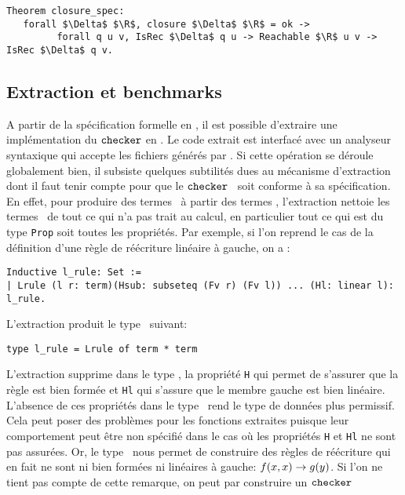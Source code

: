 \begin{lstlisting}
Theorem closure_spec:
   forall $\Delta$ $\R$, closure $\Delta$ $\R$ = ok ->
         forall q u v, IsRec $\Delta$ q u -> Reachable $\R$ u v -> IsRec $\Delta$ q v.
\end{lstlisting}

\subsection{Extraction et benchmarks}
\label{sec:benchmarks}

A partir de la spécification formelle en \coq, il est possible d'extraire une implémentation
du $\mathtt{checker}$ en \ocaml. 
Le code extrait est interfacé avec un analyseur syntaxique qui accepte les fichiers générés
par \timbuk. Si cette opération se déroule globalement bien, il subsiste quelques subtilités
dues au mécanisme d'extraction dont il faut tenir compte pour que le $\mathtt{checker}$ \ocaml\ soit conforme 
à sa spécification. En effet, pour produire des termes \ocaml\ à partir des termes \coq, l'extraction
nettoie les termes \coq\ de tout ce qui n'a pas trait au calcul, en particulier tout ce qui est du type
\lstinline!Prop! soit toutes les propriétés. Par exemple, si l'on reprend le cas de la définition 
d'une règle de réécriture linéaire à gauche, on a :
\begin{lstlisting}
Inductive l_rule: Set :=
| Lrule (l r: term)(Hsub: subseteq (Fv r) (Fv l)) ... (Hl: linear l): l_rule.
\end{lstlisting}
L'extraction produit le type \ocaml\ suivant:
\switchlstcaml
\begin{lstlisting}
type l_rule = Lrule of term * term
\end{lstlisting}
L'extraction supprime dans le type \ocaml, la propriété \lstinline!H! qui permet de s'assurer que la règle est bien
formée et \lstinline!Hl! qui s'assure que le membre gauche est bien linéaire. L'absence de ces propriétés dans le type 
\ocaml\ rend le type de données plus permissif. Cela peut poser des problèmes pour les fonctions extraites puisque
leur comportement peut être non spécifié dans le cas où les propriétés \lstinline!H! et \lstinline!Hl! ne sont pas
assurées. Or, le type \ocaml\ nous permet de construire des règles de réécriture qui en fait ne sont ni bien formées ni
linéaires à gauche: $f(x,x) \rightarrow g(y)$. Si l'on ne tient pas compte de cette remarque, on peut par construire un $\mathtt{checker}$
